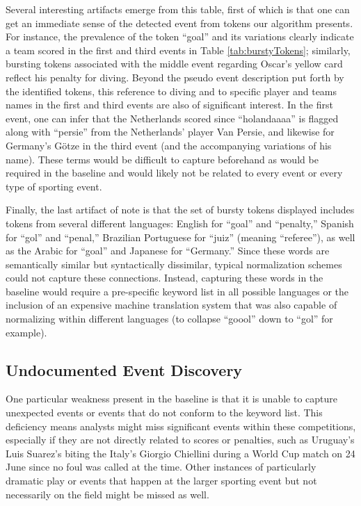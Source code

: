 \documentclass{acm_proc_article-sp}
\begin{document}
Several interesting artifacts emerge from this table, first of which is that one can get an immediate sense of the detected event from tokens our algorithm presents. 
For instance, the prevalence of the token ``goal'' and its variations clearly indicate a team scored in the first and third events in Table \ref{tab:burstyTokens}; similarly, bursting tokens associated with the middle event regarding Oscar's yellow card reflect his penalty for diving.
Beyond the pseudo event description put forth by the identified tokens, this reference to diving and to specific player and teams names in the first and third events are also of significant interest.
In the first event, one can infer that the Netherlands scored since ``holandaaaa'' is flagged along with ``persie'' from the Netherlands' player Van Persie, and likewise for Germany's G\"{o}tze in the third event (and the accompanying variations of his name).
These terms would be difficult to capture beforehand as would be required in the baseline and would likely not be related to every event or every type of sporting event.

Finally, the last artifact of note is that the set of bursty tokens displayed includes tokens from several different languages: English for ``goal'' and ``penalty,'' Spanish for ``gol'' and ``penal,'' Brazilian Portuguese for ``juiz'' (meaning ``referee''), as well as the Arabic for ``goal'' and Japanese for ``Germany.''
Since these words are semantically similar but syntactically dissimilar, typical normalization schemes could not capture these connections.
Instead, capturing these words in the baseline would require a pre-specific keyword list in all possible languages or the inclusion of an expensive machine translation system that was also capable of normalizing within different languages (to collapse ``goool'' down to ``gol'' for example).

\subsection{Undocumented Event Discovery}

One particular weakness present in the baseline is that it is unable to capture unexpected events or events that do not conform to the keyword list.
This deficiency means analysts might miss significant events within these competitions, especially if they are not directly related to scores or penalties, such as Uruguay's Luis Suarez's biting the Italy's Giorgio Chiellini during a World Cup match on 24 June since no foul was called at the time.
Other instances of particularly dramatic play or events that happen at the larger sporting event but not necessarily on the field might be missed as well.
\end{document}
